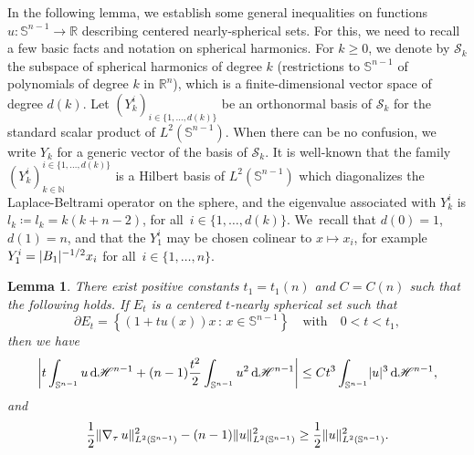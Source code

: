 \documentclass[JEP,XML,SOM,Unicode,published]{cedram}
\newcommand{\sep}{\,:\,}
\numberwithin{equation}{section}
\theoremstyle{plain}
\newtheorem{lem}[thm]{Lemma}
\theoremstyle{definition}
\newcommand{\numberset}[1]{{\mathbb{#1}}}
\newcommand{\N}{\numberset{N}}
\newcommand{\R}{\numberset{R}}
\newcommand{\dH}{\mathop{}\mathopen{}\mathrm{d}\mathscr{H}}
\newcommand{\bbS}{\mathbb{S}}
\newcommand{\calS}{{\mathcal{S}}}
\newcommand{\grad}{\nabla}
\DeclarePairedDelimiter{\abs}{\lvert}{\rvert}
\DeclarePairedDelimiter{\norm}{\lVert}{\rVert}
\begin{document}
In the following lemma, we establish some general inequalities on functions $u:\bbS^{n-1}\to \R$
describing centered nearly-spherical sets. For this, we need to recall a few basic facts and
notation on spherical harmonics. For $k\geq 0$, we denote by $\calS_k$ the subspace of spherical
harmonics of degree $k$ (\ie restrictions to $\bbS^{n-1}$ of polynomials of degree $k$ in $\R^n$),
which is a finite-dimensional vector space of degree $d(k)$.
Let $(Y_k^i)_{i\in\{1,\dotsc,d(k)\}}$ be an orthonormal basis of $\calS_k$ for the standard scalar
product of $L^2(\bbS^{n-1})$. When there can be no confusion, we write $Y_k$ for a generic vector of
the basis of $\calS_k$. It is well-known that the family $(Y_k^i)_{k\in\N}^{i\in \{1,\dotsc,d(k)\}}$
is a Hilbert basis of $L^2(\bbS^{n-1})$ which diagonalizes the Laplace-Beltrami operator on the
sphere, and the eigenvalue associated with $Y_k^i$ is $l_k\coloneqq l_k=k(k+n-2)$, for
all~$i\in\{1,\dotsc,d(k)\}$. We~recall that $d(0)=1$, $d(1)=n$, and that the $Y_1^i$ may be chosen
colinear to $x\mapsto x_i$, for example~$Y_1^i=\abs{B_1}^{-1/2} x_i$ for all~$i\in\{1,\dotsc,n\}$.

\begin{lem}\label{lem:var1min}
There exist positive constants $t_1=t_1(n)$ and $C=C(n)$ such that the following holds.
If $E_t$ is a centered $t$-nearly spherical set such that
\[
\partial
E_t=\left\{(1+tu(x))x\sep x\in\bbS^{n-1}\right\}\quad\text{with}\quad 0<t<t_1,
\]
then we have
\begin{equation}\label{var1min:res1}
\abs*{t\int_{\bbS^{n-1}} u\dH^{n-1}+(n-1)\frac{t^2}{2}\int_{\bbS^{n-1}} u^2 \dH^{n-1}} \leq
Ct^3\int_{\bbS^{n-1}} \abs{u}^3 \dH^{n-1},
\end{equation}
and
\begin{equation}\label{var1min:res2}
\begin{aligned}
\frac{1}{2}\norm{\grad_\tau\, u}_{L^2(\bbS^{n-1})}^2-(n-1)\norm{u}_{L^2(\bbS^{n-1})}^2
\geq \frac{1}{2}\norm{u}_{L^2(\bbS^{n-1})}^2.
\end{aligned}
\end{equation}
\end{lem}
\end{document}
